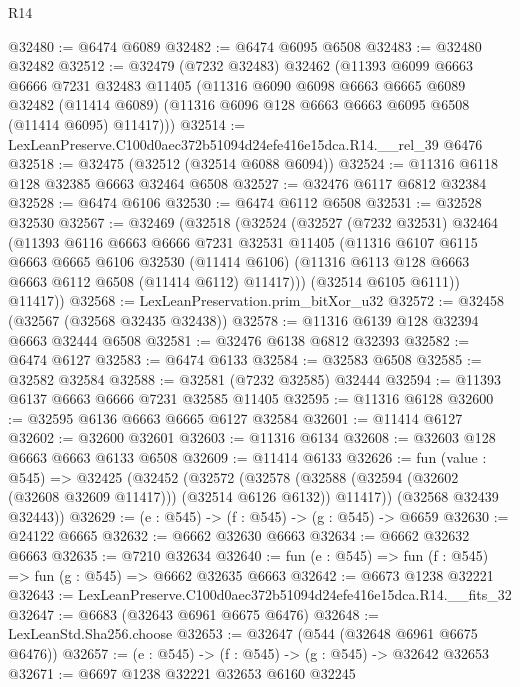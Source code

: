 \begin{lexlean}{R14}
\begin{coremodule}
@32480 := @6474 @6089
@32482 := @6474 @6095 @6508
@32483 := @32480 @32482
@32512 := @32479
    (@7232 @32483)
    @32462
    (@11393
      @6099
      @6663
      @6666
      @7231
      @32483
      @11405
      (@11316
        @6090
        @6098
        @6663
        @6665
        @6089
        @32482
        (@11414 @6089)
        (@11316 @6096 @128 @6663 @6663 @6095 @6508 (@11414 @6095) @11417)))
@32514 := LexLeanPreserve.C100d0aec372b51094d24efe416e15dca.R14.__rel_39 @6476
@32518 := @32475 (@32512 (@32514 @6088 @6094))
@32524 := @11316 @6118 @128 @32385 @6663 @32464 @6508
@32527 := @32476 @6117 @6812 @32384
@32528 := @6474 @6106
@32530 := @6474 @6112 @6508
@32531 := @32528 @32530
@32567 := @32469
    (@32518
      (@32524
        (@32527
          (@7232 @32531)
          @32464
          (@11393
            @6116
            @6663
            @6666
            @7231
            @32531
            @11405
            (@11316
              @6107
              @6115
              @6663
              @6665
              @6106
              @32530
              (@11414 @6106)
              (@11316 @6113 @128 @6663 @6663 @6112 @6508 (@11414 @6112) @11417)))
          (@32514 @6105 @6111))
        @11417))
@32568 := LexLeanPreservation.prim_bitXor_u32
@32572 := @32458 (@32567 (@32568 @32435 @32438))
@32578 := @11316 @6139 @128 @32394 @6663 @32444 @6508
@32581 := @32476 @6138 @6812 @32393
@32582 := @6474 @6127
@32583 := @6474 @6133
@32584 := @32583 @6508
@32585 := @32582 @32584
@32588 := @32581 (@7232 @32585) @32444
@32594 := @11393 @6137 @6663 @6666 @7231 @32585 @11405
@32595 := @11316 @6128
@32600 := @32595 @6136 @6663 @6665 @6127 @32584
@32601 := @11414 @6127
@32602 := @32600 @32601
@32603 := @11316 @6134
@32608 := @32603 @128 @6663 @6663 @6133 @6508
@32609 := @11414 @6133
@32626 := fun (value : @545) =>
  @32425
    (@32452
      (@32572
        (@32578 (@32588 (@32594 (@32602 (@32608 @32609 @11417))) (@32514 @6126 @6132)) @11417))
      (@32568 @32439 @32443))
@32629 := (e : @545) -> (f : @545) -> (g : @545) -> @6659
@32630 := @24122 @6665
@32632 := @6662 @32630 @6663
@32634 := @6662 @32632 @6663
@32635 := @7210 @32634
@32640 := fun (e : @545) => fun (f : @545) => fun (g : @545) => @6662 @32635 @6663
@32642 := @6673 @1238 @32221
@32643 := LexLeanPreserve.C100d0aec372b51094d24efe416e15dca.R14.__fits_32
@32647 := @6683 (@32643 @6961 @6675 @6476)
@32648 := LexLeanStd.Sha256.choose
@32653 := @32647 (@544 (@32648 @6961 @6675 @6476))
@32657 := (e : @545) -> (f : @545) -> (g : @545) -> @32642 @32653
@32671 := @6697
    @1238
    @32221
    @32653
    @6160
    @32245

\end{coremodule}
\end{lexlean}
